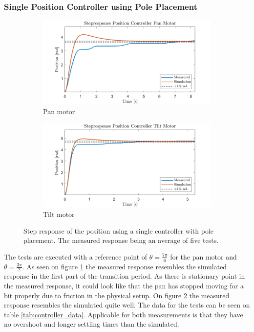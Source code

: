 \documentclass[../../main.tex]{subfiles}
\begin{document}
\subsubsection*{Single Position Controller using Pole Placement}

\begin{figure}[h]
     \centering
     \begin{subfigure}[b]{0.49\textwidth}
         \centering
         \includegraphics[width=\textwidth]{Sections/Test/Images/StepPanPosModel.png}
         \caption{Pan motor}
         \label{fig:StepPanPos}
     \end{subfigure}
     \hfill
     \begin{subfigure}[b]{0.49\textwidth}
         \centering
         \includegraphics[width=\textwidth]{Sections/Test/Images/StepTiltPosModel.png}
         \caption{Tilt motor}
         \label{fig:StepTiltPos}
     \end{subfigure}
        \caption{Step response of the position using a single controller with pole placement. The measured response being an average of five tests.}
        \label{fig:singlePosController}
\end{figure}
The tests are executed with a reference point of $\theta = \frac{7\pi}{6}$ for the pan motor and $\theta = \frac{3\pi}{2}$. As seen on figure \ref{fig:StepPanPos} the measured response resembles the simulated response in the first part of the transition period. As there is stationary point in the measured response, it could look like that the pan has stopped moving for a bit properly due to friction in the physical setup. On figure \ref{fig:StepTiltPos} the measured response resembles the simulated quite well. The data for the tests can be seen on table \ref{tab:controller_data}. Applicable for both measurements is that they have no overshoot and longer settling times than the simulated. 
\end{document}
